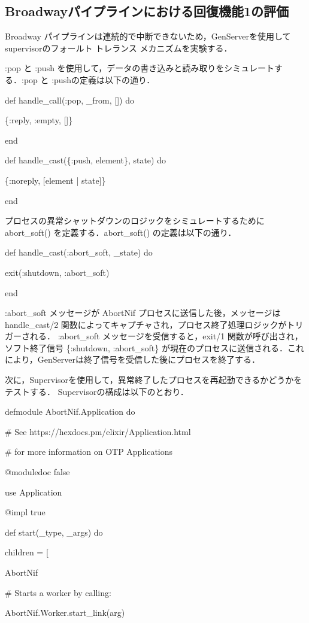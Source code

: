\documentclass[a4paper]{jreport}	%
\begin{document}
\subsection{Broadwayパイプラインにおける回復機能1の評価} 
Broadway パイプラインは連続的で中断できないため，GenServerを使用してsupervisorのフォールト トレランス メカニズムを実験する．

:pop と :push を使用して，データの書き込みと読み取りをシミュレートする．:pop と :pushの定義は以下の通り．

def handle\_call(:pop, \_from, []) do

    \{:reply, :empty, []\}
    
  end

  def handle\_cast(\{:push, element\}, state) do
  
    \{:noreply, [element | state]\}
    
  end

プロセスの異常シャットダウンのロジックをシミュレートするために abort\_soft() を定義する．abort\_soft() の定義は以下の通り．

  def handle\_cast(:abort\_soft, \_state) do
  
    exit({:shutdown, :abort_soft})
    
  end

:abort\_soft メッセージが AbortNif プロセスに送信した後，メッセージは handle\_cast/2 関数によってキャプチャされ，プロセス終了処理ロジックがトリガーされる．
:abort\_soft メッセージを受信すると，exit/1 関数が呼び出され，ソフト終了信号 \{:shutdown, :abort\_soft\} が現在のプロセスに送信される．これにより，GenServerは終了信号を受信した後にプロセスを終了する．

次に，Supervisorを使用して，異常終了したプロセスを再起動できるかどうかをテストする．
Supervisorの構成は以下のとおり．

defmodule AbortNif.Application do

  \# See https://hexdocs.pm/elixir/Application.html
  
  \# for more information on OTP Applications
  
  @moduledoc false

  use Application

  @impl true
  
  def start(\_type, \_args) do
  
    children = [
    
        AbortNif

      \# Starts a worker by calling: 
      
      AbortNif.Worker.start\_link(arg)
      
\end{document}
